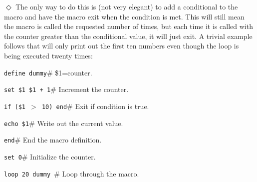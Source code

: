 \indent$\Diamond$
The only way to do this is (not very elegant) to add a
conditional to the macro and have the macro exit when
the condition is met.
This will still mean the macro is called the requested number of times,
but each time it is called with the counter greater than the
conditional value, it will just exit.
A trivial example follows that will only print out the first ten numbers
even though the loop is being executed twenty times:
\begin{wiplist}%
  \item {\tt define dummy}\hfill\# \$1=counter.
  \samepage
  \item [\wipd] {\tt set \$1 \$1 + 1}\hfill\# Increment the counter.
  \item [\wipd] {\tt if (\$1 $>$ 10) end}\hfill\# Exit if condition is true.
  \item [\wipd] {\tt echo \$1}\hfill\# Write out the current value.
  \item [\wipd] {\tt end}\hfill\#  End the macro definition.
  \item {\tt set  0}\hfill\# Initialize the counter.
  \item {\tt loop 20 dummy }\hfill\# Loop through the macro.
\end{wiplist}
